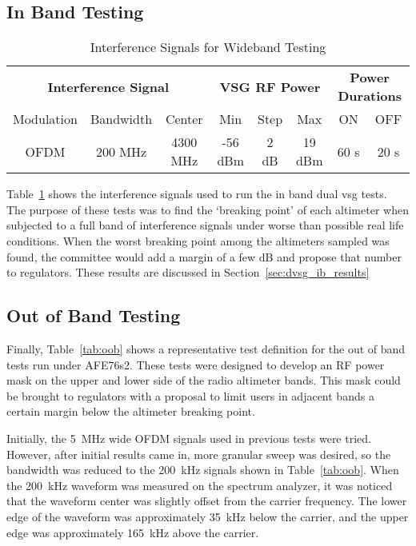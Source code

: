 \subsection{In Band Testing}\label{sub:ib}
\begin{table}[]
\begin{tabular}{c|c|c|c|c|c|c|c}
\multicolumn{3}{c|}{\textbf{Interference Signal}} & \multicolumn{3}{c|}{\textbf{VSG RF Power}} & \multicolumn{2}{c}{\textbf{Power Durations}} \\
Modulation    & Bandwidth   & Center     & Min         & Step    & Max       & ON                & OFF              \\ \hline
OFDM          & 200 MHz     & 4300 MHz   & -56 dBm     & 2 dB    & 19 dBm    & 60 s              & 20 s            
\end{tabular}
\caption{Interference Signals for Wideband Testing}
\label{tab:Wideband}
\end{table}


Table~\ref{tab:Wideband} shows the interference signals used to run the in band dual vsg tests. The purpose of these tests was to find the `breaking point' of each altimeter when subjected to a full band of interference signals under worse than possible real life conditions. When the worst breaking point among the altimeters sampled was found, the committee would add a margin of a few dB and propose that number to regulators. These results are discussed in Section~\ref{sec:dvsg_ib_results}

\subsection{Out of Band Testing}\label{sub:oob}
Finally, Table~\ref{tab:oob} shows a representative test definition for the out of band tests run under AFE76s2. These tests were designed to develop an RF power mask on the upper and lower side of the radio altimeter bands. This mask could be brought to regulators with a proposal to limit users in adjacent bands a certain margin below the altimeter breaking point. 

Initially, the 5~MHz wide OFDM signals used in previous tests were tried. However, after initial results came in, more granular sweep was desired, so the bandwidth was reduced to the 200~kHz signals shown in Table~\ref{tab:oob}. When the 200~kHz waveform was measured on the spectrum analyzer, it was noticed that the waveform center was slightly offset from the carrier frequency. The lower edge of the waveform was approximately 35~kHz below the carrier, and the upper edge was approximately 165~kHz above the carrier. 

